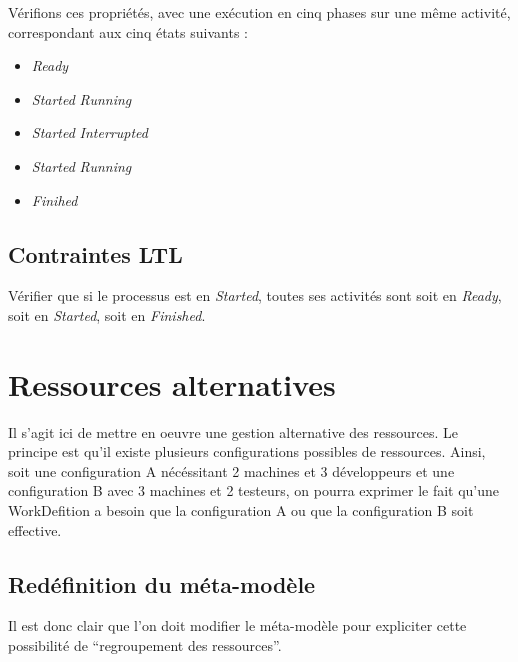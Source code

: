 Vérifions ces propriétés, avec une exécution en cinq phases sur une même activité, correspondant aux cinq états suivants :
\begin{itemize}
\item \textit{Ready}
\item \textit{Started} \textit{Running}
\item \textit{Started} \textit{Interrupted}
\item \textit{Started} \textit{Running}
\item \textit{Finihed}
\end{itemize}


\subsection{Contraintes LTL}

Vérifier que si le processus est en \textit{Started}, toutes ses activités sont soit en \textit{Ready}, soit en \textit{Started}, soit en \textit{Finished}.

\section{Ressources alternatives}

Il s'agit ici de mettre en oeuvre une gestion alternative des ressources. Le principe est qu'il existe plusieurs configurations possibles de ressources.
Ainsi, soit une configuration A nécéssitant 2 machines et 3 développeurs et une configuration B avec 3 machines et 2 testeurs, on pourra exprimer le fait qu'une WorkDefition a besoin que la configuration A ou que la configuration B soit effective.

\subsection{Redéfinition du méta-modèle}

Il est donc clair que l'on doit modifier le méta-modèle pour expliciter cette possibilité de ``regroupement des ressources''.

